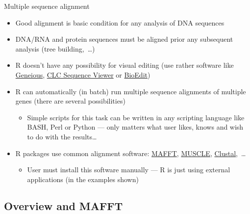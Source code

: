 \documentclass[compress, ucs, xelatex, 11pt, xcolor=svgnames,
	hyperref={
		bookmarks=true,
		unicode=true,
		colorlinks=true,
		pdftitle={Molecular data in R},
		plainpages=false,
		pdfauthor={Vojtech Zeisek},
		pdfsubject={Course about phylogeny and evolution in R},
		pdfcreator={XeLaTeX},
		pdfkeywords={R, evolution, phylogeny, molecular data},
		linkcolor=Tomato,
		anchorcolor=SaddleBrown,
		citecolor=Goldenrod,
		filecolor=DarkMagenta,
		menucolor=Sienna,
		urlcolor=DarkTurquoise,
		pdftex},
	url={hyphens, lowtilde} %
	]{beamer}
\begin{document}
\begin{frame}{Multiple sequence alignment}
	\label{alignment}
	\begin{itemize}
		\item Good alignment is basic condition for any analysis of DNA sequences
		\item DNA/RNA and protein sequences must be aligned prior any subsequent analysis (tree building,~\ldots)
		\item R doesn't have any possibility for visual editing (use rather software like \href{https://www.geneious.com/}{Geneious}, \href{https://www.qiagenbioinformatics.com/products/clc-sequence-viewer/}{CLC Sequence Viewer} or \href{http://www.mbio.ncsu.edu/bioedit/bioedit.html}{BioEdit})
		\item R can automatically (in batch) run multiple sequence alignments of multiple genes (there are several possibilities)
		\begin{itemize}
			\item Simple scripts for this task can be written in any scripting language like BASH, Perl or Python --- only matters what user likes, knows and wish to do with the results\ldots
		\end{itemize}
		\item R packages use common alignment software: \href{https://mafft.cbrc.jp/alignment/software/}{MAFFT}, \href{https://www.drive5.com/muscle/}{MUSCLE}, \href{http://clustal.org/}{Clustal},~\ldots
		\begin{itemize}
			\item User must install this software manually --- R is just using external applications (in the examples shown)
		\end{itemize}
	\end{itemize}
\end{frame}

\subsection{Overview and MAFFT}
\end{document}
